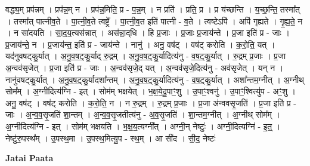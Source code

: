\documentclass[17pt]{extarticle}
\begin{document}
वद्ध्य॒म् प्रप॑न्नम् । प्रप॑न्न॒म् न । प्रप॑न्न॒मिति॒ प्र - प॒न्न॒म् । न प्रति॑ । प्रति॒ प्र । प्र य॑च्छन्ति । य॒च्छ॒न्ति॒ तस्मा᳚त् । तस्मा᳚त् पात्नीव॒ते । पा॒त्नी॒व॒ते त्वष्ट्रे᳚ । पा॒त्नी॒व॒त इति॑ पात्नी - व॒ते । त्वष्टेऽपि॑ । अपि॑ गृह्यते । गृ॒ह्य॒ते॒ न । न सा॑दयति । सा॒द॒य॒त्यस॑न्नात् । अस॑न्ना॒द्‌धि । हि प्र॒जाः । प्र॒जाः प्र॒जाय॑न्ते । प्र॒जा इति॑ प्र - जाः । प्र॒जाय॑न्ते॒ न । प्र॒जाय॑न्त॒ इति॑ प्र - जाय॑न्ते । नानु॑ । अनु॒ वष॑ट् । वष॑ट् करोति । क॒रो॒ति॒ यत् । यद॑नुवषट्कु॒र्यात् । अ॒नु॒व॒ष॒ट्॒कु॒र्याद् रु॒द्रम् । अ॒नु॒व॒ष॒ट्॒कु॒र्यादित्य॑नु - व॒ष॒ट्॒कु॒र्यात् । रु॒द्रम् प्र॒जाः । प्र॒जा अ॒न्वव॑सृजेत् । प्र॒जा इति॑ प्र - जाः । अ॒न्वव॑सृजे॒द् यत् । अ॒न्वव॑सृजे॒दित्य॑नु - अव॑सृजेत् । यन् न । नानु॑वषट्कु॒र्यात् । अ॒नु॒व॒ष॒ट्॒कु॒र्यादशा᳚न्तम् । अ॒नु॒व॒ष॒ट्॒कु॒र्यादित्य॑नु - व॒ष॒ट्॒कु॒र्यात् । अशा᳚न्तम॒ग्नीत् । अ॒ग्नीथ् सोम᳚म् । अ॒ग्नीदित्य॑ग्नि - इत् । सोम॑म् भक्षयेत् । भ॒क्ष॒ये॒दु॒पाꣳ॒॒शु । उ॒पाꣳ॒॒श्वनु॑ । उ॒पाꣳ॒॒श्वित्यु॑प - अꣳ॒॒शु । अनु॒ वष॑ट् । वष॑ट् करोति । क॒रो॒ति॒ न । न रु॒द्रम् । रु॒द्रम् प्र॒जाः । प्र॒जा अ॑न्ववसृ॒जति॑ । प्र॒जा इति॑ प्र - जाः । अ॒न्व॒व॒सृ॒जति॑ शा॒न्तम् । अ॒न्व॒व॒सृ॒जतीत्य॑नु - अ॒व॒सृ॒जति॑ । शा॒न्तम॒ग्नीत् । अ॒ग्नीथ् सोम᳚म् । अ॒ग्नीदित्य॑ग्नि - इत् । सोम॑म् भक्षयति । भ॒क्ष॒य॒त्यग्नी᳚त् । अग्नी॒न् नेष्टुः॑ । अग्नी॒दित्यग्नि॑ - इ॒त्॒ । नेष्टु॑रु॒पस्थ᳚म् । उ॒पस्थ॒मा । उ॒पस्थ॒मित्यु॒प - स्थ॒म् । आ सी॑द । सी॒द॒ नेष्टः॑ \newline

\textbf{Jatai Paata} \newline
\end{document}
